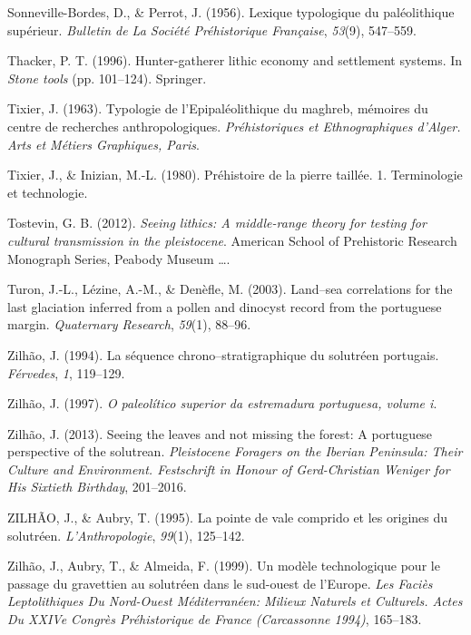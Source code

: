 \documentclass[12pt,twoside]{reedthesis}
\begin{document}
\leavevmode\hypertarget{ref-sonneville-bordes1956}{}%
Sonneville-Bordes, D., \& Perrot, J. (1956). Lexique typologique du paléolithique supérieur. \emph{Bulletin de La Société Préhistorique Française}, \emph{53}(9), 547--559.

\leavevmode\hypertarget{ref-thacker1996}{}%
Thacker, P. T. (1996). Hunter-gatherer lithic economy and settlement systems. In \emph{Stone tools} (pp. 101--124). Springer.

\leavevmode\hypertarget{ref-tixier1963}{}%
Tixier, J. (1963). Typologie de l'Epipaléolithique du maghreb, mémoires du centre de recherches anthropologiques. \emph{Préhistoriques et Ethnographiques d'Alger. Arts et Métiers Graphiques, Paris}.

\leavevmode\hypertarget{ref-tixier1980}{}%
Tixier, J., \& Inizian, M.-L. (1980). Préhistoire de la pierre taillée. 1. Terminologie et technologie.

\leavevmode\hypertarget{ref-tostevin2012}{}%
Tostevin, G. B. (2012). \emph{Seeing lithics: A middle-range theory for testing for cultural transmission in the pleistocene}. American School of Prehistoric Research Monograph Series, Peabody Museum \ldots.

\leavevmode\hypertarget{ref-turon2003}{}%
Turon, J.-L., Lézine, A.-M., \& Denèfle, M. (2003). Land--sea correlations for the last glaciation inferred from a pollen and dinocyst record from the portuguese margin. \emph{Quaternary Research}, \emph{59}(1), 88--96.

\leavevmode\hypertarget{ref-zilhao1994}{}%
Zilhão, J. (1994). La séquence chrono--stratigraphique du solutréen portugais. \emph{Férvedes}, \emph{1}, 119--129.

\leavevmode\hypertarget{ref-zilhao1997}{}%
Zilhão, J. (1997). \emph{O paleolítico superior da estremadura portuguesa, volume i}.

\leavevmode\hypertarget{ref-zilhao2013}{}%
Zilhão, J. (2013). Seeing the leaves and not missing the forest: A portuguese perspective of the solutrean. \emph{Pleistocene Foragers on the Iberian Peninsula: Their Culture and Environment. Festschrift in Honour of Gerd-Christian Weniger for His Sixtieth Birthday}, 201--2016.

\leavevmode\hypertarget{ref-zilhaoetal1995}{}%
ZILHÃO, J., \& Aubry, T. (1995). La pointe de vale comprido et les origines du solutréen. \emph{L'Anthropologie}, \emph{99}(1), 125--142.

\leavevmode\hypertarget{ref-zilhaoetal1999}{}%
Zilhão, J., Aubry, T., \& Almeida, F. (1999). Un modèle technologique pour le passage du gravettien au solutréen dans le sud-ouest de l'Europe. \emph{Les Faciès Leptolithiques Du Nord-Ouest Méditerranéen: Milieux Naturels et Culturels. Actes Du XXIVe Congrès Préhistorique de France (Carcassonne 1994)}, 165--183.


\end{document}
